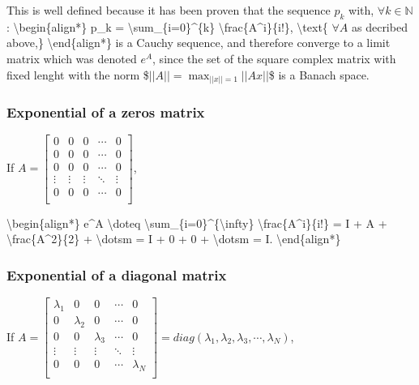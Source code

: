 \documentclass[letterpaper,10pt,english]{jupyterBook}
\begin{document}
\sphinxAtStartPar
This is well defined because it has been proven that the sequence \({p_k}\) with, \(\forall k \in \mathbb{N}\):
\textbackslash{}begin\{align*\}
p\_k = \textbackslash{}sum\_\{i=0\}\textasciicircum{}\{k\} \textbackslash{}frac\{A\textasciicircum{}i\}\{i!\}, \textbackslash{}text\{ \(\forall A\) as decribed above,\}
\textbackslash{}end\{align*\}
is a Cauchy sequence, and therefore converge to a limit matrix which was denoted \(e^A\), since the set of the square complex matrix with fixed lenght with the norm
\$\(
||A|| = \max_{||x||=1} ||Ax||
\)\$
is a Banach space.


\subsubsection{Exponential of a zeros matrix}
\label{\detokenize{cap3:exponential-of-a-zeros-matrix}}
\sphinxAtStartPar
If \(A =   
\left[ {\begin{array}{ccccc}
    0 & 0 & 0 & \dotsm & 0\\
    0 & 0 & 0 & \dotsm & 0\\
    0 & 0 & 0 & \dotsm & 0\\
    \vdots & \vdots & \vdots & \ddots & \vdots\\
    0 & 0 & 0 & \dotsm & 0\\
\end{array} } \right] \),

\sphinxAtStartPar
\textbackslash{}begin\{align*\}
e\textasciicircum{}A \textbackslash{}doteq \textbackslash{}sum\_\{i=0\}\textasciicircum{}\{\textbackslash{}infty\} \textbackslash{}frac\{A\textasciicircum{}i\}\{i!\} = I + A + \textbackslash{}frac\{A\textasciicircum{}2\}\{2\} + \textbackslash{}dotsm = I + 0 + 0 + \textbackslash{}dotsm = I.
\textbackslash{}end\{align*\}


\subsubsection{Exponential of a diagonal matrix}
\label{\detokenize{cap3:exponential-of-a-diagonal-matrix}}
\sphinxAtStartPar
If \(A =   
\left[ {\begin{array}{ccccc}
    \lambda_1 & 0 & 0 & \dotsm & 0\\
    0 & \lambda_2 & 0 & \dotsm & 0\\
    0 & 0 & \lambda_3 & \dotsm & 0\\
    \vdots & \vdots & \vdots & \ddots & \vdots\\
    0 & 0 & 0 & \dotsm & \lambda_{N}\\
\end{array} } \right] 
  = diag(\lambda_1, \lambda_2, \lambda_3, \dotsm, \lambda_N)\),
\end{document}

